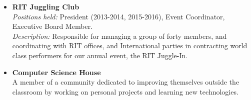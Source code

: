 \documentclass[10pt]{article}
\begin{document}
\vspace{1ex}
\begin{itemize} [topsep=.5ex, itemsep=0ex, partopsep=0ex, parsep=1ex]
	\item[] {\bf RIT Juggling Club}\\
	{\it Positions held:}  President (2013-2014, 2015-2016), Event Coordinator, Executive Board Member.\\
	{\it Description:} Responsible for managing a group of forty members, and coordinating with RIT offices, and International parties in contracting world class performers for our annual event, the RIT Juggle-In.
	\item[]{\bf Computer Science House}\\
	A member of a community dedicated to improving themselves outside the classroom by working on personal projects and learning new technologies.
\end{itemize}
\end{document}
